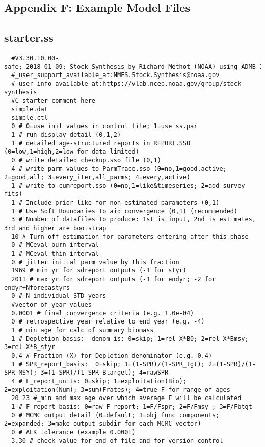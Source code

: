 \begin{landscape}

\section{Appendix F: Example Model Files}


\subsection{starter.ss}
\scriptsize{
\begin{verbatim}
  #V3.30.10.00-safe;_2018_01_09;_Stock_Synthesis_by_Richard_Methot_(NOAA)_using_ADMB_11.6
  #_user_support_available_at:NMFS.Stock.Synthesis@noaa.gov
  #_user_info_available_at:https://vlab.ncep.noaa.gov/group/stock-synthesis
  #C starter comment here
  simple.dat
  simple.ctl
  0 # 0=use init values in control file; 1=use ss.par
  1 # run display detail (0,1,2)
  1 # detailed age-structured reports in REPORT.SSO (0=low,1=high,2=low for data-limited) 
  0 # write detailed checkup.sso file (0,1) 
  4 # write parm values to ParmTrace.sso (0=no,1=good,active; 2=good,all; 3=every_iter,all_parms; 4=every,active)
  1 # write to cumreport.sso (0=no,1=like&timeseries; 2=add survey fits)
  1 # Include prior_like for non-estimated parameters (0,1) 
  1 # Use Soft Boundaries to aid convergence (0,1) (recommended)
  3 # Number of datafiles to produce: 1st is input, 2nd is estimates, 3rd and higher are bootstrap
  10 # Turn off estimation for parameters entering after this phase
  0 # MCeval burn interval
  1 # MCeval thin interval
  0 # jitter initial parm value by this fraction
  1969 # min yr for sdreport outputs (-1 for styr)
  2011 # max yr for sdreport outputs (-1 for endyr; -2 for endyr+Nforecastyrs
  0 # N individual STD years 
  #vector of year values 
  0.0001 # final convergence criteria (e.g. 1.0e-04) 
  0 # retrospective year relative to end year (e.g. -4)
  1 # min age for calc of summary biomass
  1 # Depletion basis:  denom is: 0=skip; 1=rel X*B0; 2=rel X*Bmsy; 3=rel X*B_styr
  0.4 # Fraction (X) for Depletion denominator (e.g. 0.4)
  1 # SPR_report_basis:  0=skip; 1=(1-SPR)/(1-SPR_tgt); 2=(1-SPR)/(1-SPR_MSY); 3=(1-SPR)/(1-SPR_Btarget); 4=rawSPR
  4 # F_report_units: 0=skip; 1=exploitation(Bio); 2=exploitation(Num); 3=sum(Frates); 4=true F for range of ages
  20 23 #_min and max age over which average F will be calculated
  1 # F_report_basis: 0=raw_F_report; 1=F/Fspr; 2=F/Fmsy ; 3=F/Fbtgt
  0 # MCMC output detail (0=default; 1=obj func components; 2=expanded; 3=make output subdir for each MCMC vector)
  0 # ALK tolerance (example 0.0001)
  3.30 # check value for end of file and for version control
\end{verbatim}
}



\end{landscape}
